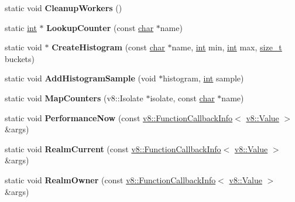 \begin{DoxyCompactItemize}
static void {\bfseries Cleanup\+Workers} ()
\item 
\mbox{\label{classv8_1_1Shell_ab3c2e43e32a1543b0a78f728bb3df63a}} 
static \mbox{\hyperlink{classint}{int}} $\ast$ {\bfseries Lookup\+Counter} (const \mbox{\hyperlink{classchar}{char}} $\ast$name)
\item 
\mbox{\label{classv8_1_1Shell_a59e39d63603b1766c86614c7a9db0545}} 
static void $\ast$ {\bfseries Create\+Histogram} (const \mbox{\hyperlink{classchar}{char}} $\ast$name, \mbox{\hyperlink{classint}{int}} min, \mbox{\hyperlink{classint}{int}} max, \mbox{\hyperlink{classsize__t}{size\+\_\+t}} buckets)
\item 
\mbox{\label{classv8_1_1Shell_a0a1b3ff04a7253ba159519945ee7e2e8}} 
static void {\bfseries Add\+Histogram\+Sample} (void $\ast$histogram, \mbox{\hyperlink{classint}{int}} sample)
\item 
\mbox{\label{classv8_1_1Shell_af8dc3050b831dab01d9532612f517a9c}} 
static void {\bfseries Map\+Counters} (v8\+::\+Isolate $\ast$isolate, const \mbox{\hyperlink{classchar}{char}} $\ast$name)
\item 
\mbox{\label{classv8_1_1Shell_a20b4f5fb7215088193a8bcf94a622f83}} 
static void {\bfseries Performance\+Now} (const \mbox{\hyperlink{classv8_1_1FunctionCallbackInfo}{v8\+::\+Function\+Callback\+Info}}$<$ \mbox{\hyperlink{classv8_1_1Value}{v8\+::\+Value}} $>$ \&args)
\item 
\mbox{\label{classv8_1_1Shell_a9a9b12463634c52f521809404acfe972}} 
static void {\bfseries Realm\+Current} (const \mbox{\hyperlink{classv8_1_1FunctionCallbackInfo}{v8\+::\+Function\+Callback\+Info}}$<$ \mbox{\hyperlink{classv8_1_1Value}{v8\+::\+Value}} $>$ \&args)
\item 
\mbox{\label{classv8_1_1Shell_a9b3772fd4ecaac0b3586e66e9c18bcde}} 
static void {\bfseries Realm\+Owner} (const \mbox{\hyperlink{classv8_1_1FunctionCallbackInfo}{v8\+::\+Function\+Callback\+Info}}$<$ \mbox{\hyperlink{classv8_1_1Value}{v8\+::\+Value}} $>$ \&args)
\item 
\mbox{\label{classv8_1_1Shell_acee30321581bbf1c878a31ca8c54d546}} 

\end{DoxyCompactItemize}
